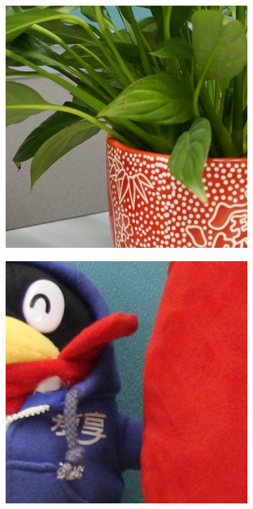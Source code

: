 \begin{figure}
\begin{subfigure}[t]{0.19\textwidth}
    \end{subfigure}
    \hfill
    \begin{subfigure}[t]{0.19\textwidth}
        \centering
        \includegraphics[width=1\textwidth]{images/dataset/Sony_4-5_125_3200_plant_10_mean.JPG}
    \end{subfigure}
       \hfill
    \begin{subfigure}[t]{0.19\textwidth}
        \centering
        \includegraphics[width=1\textwidth]{images/dataset/Canon600D_4-5_125_1600_toy_16_real.JPG}

\end{subfigure}
\end{figure}
